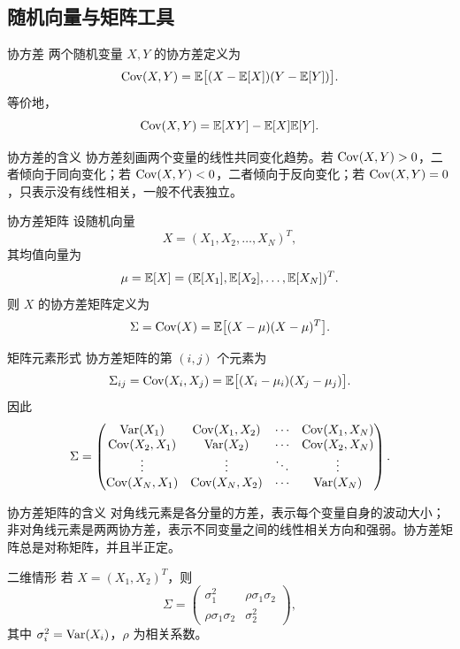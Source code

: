 \subsection{随机向量与矩阵工具}

\begin{definitionBox}{协方差}
两个随机变量 $X,Y$ 的协方差定义为
\[
\operatorname{Cov}(X,Y)=\mathbb{E}\bigl[(X-\mathbb{E}[X])(Y-\mathbb{E}[Y])\bigr].
\]
等价地，
\[
\operatorname{Cov}(X,Y)=\mathbb{E}[XY]-\mathbb{E}[X]\mathbb{E}[Y].
\]
\end{definitionBox}

\begin{keypoint}{协方差的含义}
协方差刻画两个变量的线性共同变化趋势。若 $\operatorname{Cov}(X,Y)>0$，二者倾向于同向变化；若 $\operatorname{Cov}(X,Y)<0$，二者倾向于反向变化；若 $\operatorname{Cov}(X,Y)=0$，只表示没有线性相关，一般不代表独立。
\end{keypoint}

\begin{definitionBox}{协方差矩阵}
设随机向量
\[
X=(X_1,X_2,\dots,X_N)^T,
\]
其均值向量为
\[
\mu=\mathbb{E}[X]=(\mathbb{E}[X_1],\mathbb{E}[X_2],\dots,\mathbb{E}[X_N])^T.
\]
则 $X$ 的协方差矩阵定义为
\[
\Sigma=\operatorname{Cov}(X)=\mathbb{E}\bigl[(X-\mu)(X-\mu)^T\bigr].
\]
\end{definitionBox}

\begin{formulaBox}{矩阵元素形式}
协方差矩阵的第 $(i,j)$ 个元素为
\[
\Sigma_{ij}=\operatorname{Cov}(X_i,X_j)=\mathbb{E}\bigl[(X_i-\mu_i)(X_j-\mu_j)\bigr].
\]
因此
\[
\Sigma=
\begin{pmatrix}
\operatorname{Var}(X_1) & \operatorname{Cov}(X_1,X_2) & \cdots & \operatorname{Cov}(X_1,X_N) \\
\operatorname{Cov}(X_2,X_1) & \operatorname{Var}(X_2) & \cdots & \operatorname{Cov}(X_2,X_N) \\
\vdots & \vdots & \ddots & \vdots \\
\operatorname{Cov}(X_N,X_1) & \operatorname{Cov}(X_N,X_2) & \cdots & \operatorname{Var}(X_N)
\end{pmatrix}.
\]
\end{formulaBox}

\begin{keypoint}{协方差矩阵的含义}
对角线元素是各分量的方差，表示每个变量自身的波动大小；非对角线元素是两两协方差，表示不同变量之间的线性相关方向和强弱。协方差矩阵总是对称矩阵，并且半正定。
\end{keypoint}

\begin{formulaBox}{二维情形}
若 $X=(X_1,X_2)^T$，则
\[
\Sigma=
\begin{pmatrix}
\sigma_1^2 & \rho\sigma_1\sigma_2 \\
\rho\sigma_1\sigma_2 & \sigma_2^2
\end{pmatrix},
\]
其中 $\sigma_i^2=\operatorname{Var}(X_i)$，$\rho$ 为相关系数。
\end{formulaBox}

